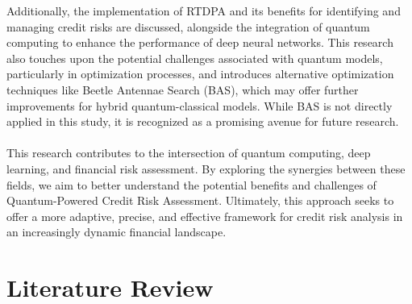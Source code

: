 \documentclass[a4paper]{article}
\begin{document}
\noindent Additionally, the implementation of RTDPA and its benefits for identifying and managing credit risks are discussed, alongside the integration of quantum computing to enhance the performance of deep neural networks. This research also touches upon the potential challenges associated with quantum models, particularly in optimization processes, and introduces alternative optimization techniques like Beetle Antennae Search (BAS), which may offer further improvements for hybrid quantum-classical models. While BAS is not directly applied in this study, it is recognized as a promising avenue for future research.\\\\This research contributes to the intersection of quantum computing, deep learning, and financial risk assessment. By exploring the synergies between these fields, we aim to better understand the potential benefits and challenges of Quantum-Powered Credit Risk Assessment. Ultimately, this approach seeks to offer a more adaptive, precise, and effective framework for credit risk analysis in an increasingly dynamic financial landscape.

\section{Literature Review}
\end{document}
